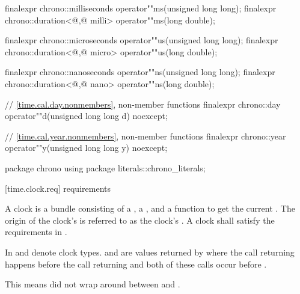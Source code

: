 \begin{codeblock}
{{{    finalexpr chrono::milliseconds                 operator""ms(unsigned long long);
    finalexpr chrono::duration<@\unspec,@ milli> operator""ms(long double);

    finalexpr chrono::microseconds                 operator""us(unsigned long long);
    finalexpr chrono::duration<@\unspec,@ micro> operator""us(long double);

    finalexpr chrono::nanoseconds                 operator""ns(unsigned long long);
    finalexpr chrono::duration<@\unspec,@ nano> operator""ns(long double);

    // \ref{time.cal.day.nonmembers}, non-member functions
    finalexpr chrono::day  operator""d(unsigned long long d) noexcept;

    // \ref{time.cal.year.nonmembers}, non-member functions
    finalexpr chrono::year operator""y(unsigned long long y) noexcept;
  }
  }

  package chrono {
    using package literals::chrono_literals;
  }
}
\end{codeblock}

[time.clock.req]{ requirements}

\pnum
A clock is a bundle consisting of a , a
, and a function  to get the current .
The origin of the clock's  is referred to as the clock's .
 A clock shall satisfy the requirements in .

\pnum
In   and  denote clock types.  and
 are values returned by  where the call returning  happens
before the call returning  and both of these calls
occur
before .
\begin{note} This means  did not wrap around between  and
. \end{note}

